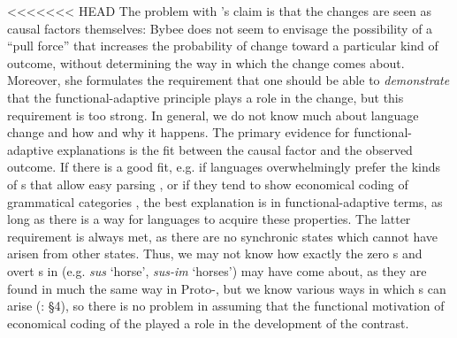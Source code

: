 \documentclass[output=paper]{langsci/langscibook}
\begin{document}
\largerpage
<<<<<<< HEAD
The problem with ’s claim is that the changes are seen as causal factors themselves: Bybee does not seem to envisage the possibility of a “pull force” that increases the probability of change toward a particular kind of outcome, without determining the way in which the change comes about. Moreover, she formulates the requirement that one should be able to \textit{demonstrate} that the functional-adaptive principle plays a role in the change, but this requirement is too strong. In general, we do not know much about language change and how and why it happens. The primary evidence for functional-adaptive explanations is the fit between the causal factor and the observed outcome. If there is a good fit, e.g. if languages overwhelmingly prefer the kinds of s that allow easy parsing \citep{Hawkins2014_VarEff}, or if they tend to show economical coding of grammatical categories \citep{Haspelmath2008_FreqIcon}, the best explanation is in functional-adaptive terms, as long as there is a way for languages to acquire these properties. The latter requirement is always met, as there are no synchronic states which cannot have arisen from other states. Thus, we may not know how exactly the zero s and overt s in  (e.g. \textit{sus} ‘horse’, \textit{sus-im} ‘horses’) may have come about, as they are found in much the same way in Proto-, but we know various ways in which s can arise (\citealt{Cristofaro2013}: §4), so there is no problem in assuming that the functional motivation of economical coding of the  played a role in the development of the contrast.
\end{document}
